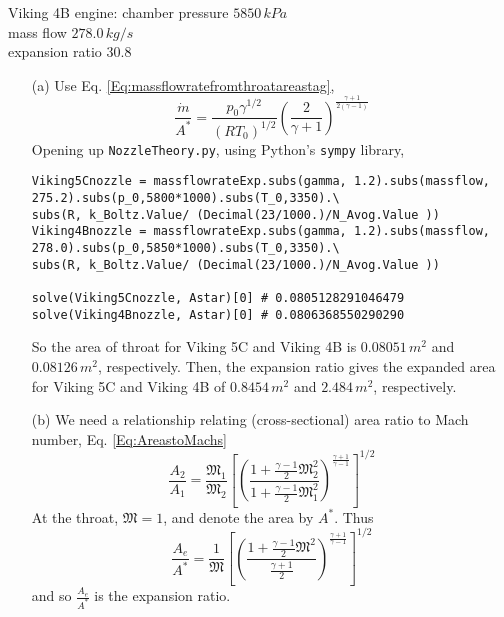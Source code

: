 \documentclass[10pt]{amsart}
\begin{document}
\begin{multicols*}{2}
Viking 4B engine: chamber pressure $5850 \, kPa$ \\
mass flow $278.0 \, kg/s$ \\
expansion ratio $30.8$

\begin{enumerate}
\item[(a)] Use Eq. \ref{Eq:massflowratefromthroatareastag},
\[
\frac{\dot{m}}{ A^*} = \frac{p_0 \gamma^{1/2} }{ (RT_0)^{1/2} } \left( \frac{2}{\gamma +1 } \right)^{ \frac{\gamma +1 }{ 2(\gamma -1 ) } }
\]
Opening up \verb|NozzleTheory.py|, using Python's \verb|sympy| library,
\begin{lstlisting}
Viking5Cnozzle = massflowrateExp.subs(gamma, 1.2).subs(massflow, 275.2).subs(p_0,5800*1000).subs(T_0,3350).\
subs(R, k_Boltz.Value/ (Decimal(23/1000.)/N_Avog.Value ))
Viking4Bnozzle = massflowrateExp.subs(gamma, 1.2).subs(massflow, 278.0).subs(p_0,5850*1000).subs(T_0,3350).\
subs(R, k_Boltz.Value/ (Decimal(23/1000.)/N_Avog.Value ))

solve(Viking5Cnozzle, Astar)[0] # 0.0805128291046479
solve(Viking4Bnozzle, Astar)[0] # 0.0806368550290290
\end{lstlisting}
So the area of throat for Viking 5C and Viking 4B is $0.08051 \, m^2$ and $0.08126 \, m^2$, respectively.  Then, the expansion ratio gives the expanded area for Viking 5C and Viking 4B of $0.8454 \, m^2$ and $2.484 \, m^2$, respectively.
\item[(b)] We need a relationship relating (cross-sectional) area ratio to Mach number, Eq. \ref{Eq:AreastoMachs}
\[
\frac{A_2}{A_1} = \frac{ \mathfrak{M}_1}{\mathfrak{M}_2} \left[ \left( \frac{ 1 + \frac{\gamma-1}{2} \mathfrak{M}_2^2 }{ 1 + \frac{\gamma-1}{2} \mathfrak{M}_1^2 } \right)^{\frac{ \gamma+1}{\gamma -1} } \right]^{1/2}
\]
At the throat, $\mathfrak{M}=1$, and denote the area by $A^*$.  Thus
\[
\frac{A_e}{A^*} = \frac{1}{\mathfrak{M}} \left[ \left( \frac{1 + \frac{\gamma - 1}{2} \mathfrak{M}^2 }{ \frac{\gamma + 1}{2} } \right)^{\frac{\gamma +1 }{ \gamma -1 }} \right]^{1/2}
\]
and so $\frac{A_e}{A^*}$ is the expansion ratio.  


\end{enumerate}
\end{multicols*}
\end{document}
